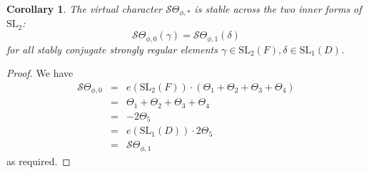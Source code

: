 \documentclass[11pt]{amsart}
\numberwithin{equation}{section}
\newtheorem{cor}[equation]{Corollary}
\def\SL{\mathrm{SL}}
\newcommand{\<}{\left\langle}
\renewcommand{\>}{\right\rangle}
\begin{document}
\begin{cor}  The virtual  character $\mathscr{S}\Theta_{\phi,*}$ is stable across the two inner forms of $\SL_2$:
\[
\mathscr{S}\Theta_{\phi, 0}(\gamma) = \mathscr{S}\Theta_{\phi, 1}(\delta)
\]
for all stably conjugate strongly regular elements $\gamma \in \SL_2(F),  \delta \in \SL_1(D)$.  
\end{cor}
\begin{proof} We have
\begin{eqnarray*}
\mathscr{S}\Theta_{\phi, 0} &=& e(\SL_2(F)) \cdot (\Theta_1 + \Theta_2 + \Theta_3 + \Theta_4)\\
&=& \Theta_1 + \Theta_2 + \Theta_3 + \Theta_4\\
&=& -2 \Theta_5\\
&=& e(\SL_1(D)) \cdot 2 \Theta_5\\
&=& \mathscr{S}\Theta_{\phi, 1}
\end{eqnarray*}
as required.   
\end{proof}



 

\end{document}
